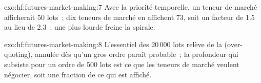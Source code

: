 \begin{solution}{exo:hf:futures-market-making:7}
Avec la priorité temporelle, un teneur de marché afficherait 50 lots~; dix teneurs de marché en affichent 73, soit un facteur de 1.5 au lieu de 2.3~: une  plus lourde freine la
spirale.
\end{solution}

\begin{solution}{exo:hf:futures-market-making:8}
L'essentiel des 20\,000 lots relève de la  (over-quoting), annulée dès qu'un gros ordre paraît probable~; la profondeur qui subsiste pour un ordre de 500 lots est
ce que les teneurs de marché veulent négocier, soit une fraction de ce qui est affiché.
\end{solution}


